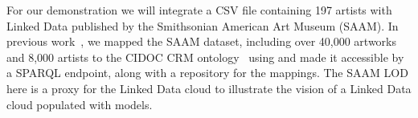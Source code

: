 For our demonstration we will integrate a CSV file containing 197 artists with Linked Data published by the Smithsonian American Art Museum (SAAM). 
In previous work~\cite{Szekely:2013vq}, we mapped the SAAM dataset, including over 40,000 artworks and 8,000 artists to the CIDOC CRM ontology~\cite{Doerr:2003:CCR:958671.958678} using \rtworml and made it accessible by a SPARQL endpoint, along with a repository for the \rtworml mappings.
The SAAM LOD here is a proxy for the Linked Data cloud to illustrate the vision of a Linked Data cloud populated with \rtworml models.

